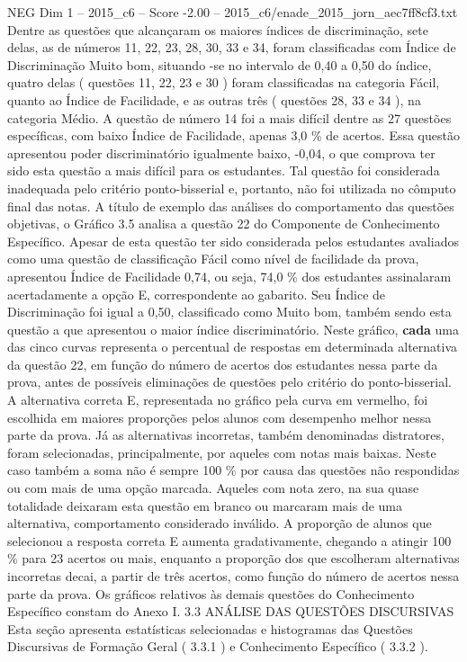 \begin{textsample}{NEG Dim 1 – 2015\_c6 – Score -2.00 – 2015\_c6/enade\_2015\_jorn\_aec7ff8cf3.txt}
Dentre as questões que alcançaram os maiores índices de discriminação, sete delas, as de números 11, 22, 23, 28, 30, 33 e 34, foram classificadas com Índice de Discriminação Muito bom, situando -se no intervalo de 0,40 a 0,50 do índice, quatro delas ( questões 11, 22, 23 e 30 ) foram classificadas na categoria Fácil, quanto ao Índice de Facilidade, e as outras três ( questões 28, 33 e 34 ), na categoria Médio.
A questão de número 14 foi a mais difícil dentre as 27 questões específicas, com baixo Índice de Facilidade, apenas 3,0 \% de acertos.
Essa questão apresentou poder discriminatório igualmente baixo, -0,04, o que comprova ter sido esta questão a mais difícil para os estudantes.
Tal questão foi considerada inadequada pelo critério ponto-bisserial e, portanto, não foi utilizada no cômputo final das notas.
A título de exemplo das análises do comportamento das questões objetivas, o Gráfico 3.5 analisa a questão 22 do Componente de Conhecimento Específico.
Apesar de esta questão ter sido considerada pelos estudantes avaliados como uma questão de classificação Fácil como nível de facilidade da prova, apresentou Índice de Facilidade 0,74, ou seja, 74,0 \% dos estudantes assinalaram acertadamente a opção E, correspondente ao gabarito.
Seu Índice de Discriminação foi igual a 0,50, classificado como Muito bom, também sendo esta questão a que apresentou o maior índice discriminatório.
Neste gráfico, \textbf{cada} uma das cinco curvas representa o percentual de respostas em determinada alternativa da questão 22, em função do número de acertos dos estudantes nessa parte da prova, antes de possíveis eliminações de questões pelo critério do ponto-bisserial.
A alternativa correta E, representada no gráfico pela curva em vermelho, foi escolhida em maiores proporções pelos alunos com desempenho melhor nessa parte da prova.
Já as alternativas incorretas, também denominadas distratores, foram selecionadas, principalmente, por aqueles com notas mais baixas.
Neste caso também a soma não é sempre 100 \% por causa das questões não respondidas ou com mais de uma opção marcada.
Aqueles com nota zero, na sua quase totalidade deixaram esta questão em branco ou marcaram mais de uma alternativa, comportamento considerado inválido.
A proporção de alunos que selecionou a resposta correta E aumenta gradativamente, chegando a atingir 100 \% para 23 acertos ou mais, enquanto a proporção dos que escolheram alternativas incorretas decai, a partir de três acertos, como função do número de acertos nessa parte da prova.
Os gráficos relativos às demais questões do Conhecimento Específico constam do Anexo I. 3.3 ANÁLISE DAS QUESTÕES DISCURSIVAS Esta seção apresenta estatísticas selecionadas e histogramas das Questões Discursivas de Formação Geral ( 3.3.1 ) e Conhecimento Específico ( 3.3.2 ).

\end{textsample}
